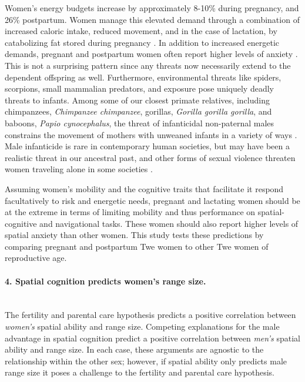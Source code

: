 Women's energy budgets increase by approximately 8-10\% during pregnancy, and 26\% postpartum.  Women manage this elevated demand through a combination of increased caloric intake, reduced movement, and in the case of lactation, by catabolizing fat stored during pregnancy \citep{dufour2002comparative}.  In addition to increased energetic demands, pregnant and postpartum women often report higher levels of anxiety \citep{heron2004course, wenzel2003prevalence}.  This is not a surprising pattern since any threats now necessarily extend to the dependent offspring as well.  Furthermore, environmental threats like spiders, scorpions, small mammalian predators, and exposure pose uniquely deadly threats to infants.  Among some of our closest primate relatives, including chimpanzees, \emph{Chimpanzee chimpanzee}, gorillas, \emph{Gorilla gorilla gorilla}, and baboons, \emph{Papio cynocephalus}, the threat of infanticidal non-paternal males constrains the movement of mothers with unweaned infants in a variety of ways \citep{collins1984infanticide, watts1989infanticide, smuts1992male, stokes2003female, watts2000infanticide}.  Male infanticide is rare in contemporary human societies, but may have been a realistic threat in our ancestral past, and other forms of sexual violence threaten women traveling alone in some societies \citep{gregor1987anxious}.


Assuming women's mobility and the cognitive traits that facilitate it respond facultatively to risk and energetic needs, pregnant and lactating women should be at the extreme in terms of limiting mobility and thus performance on spatial-cognitive and navigational tasks.  These women should also report higher levels of spatial anxiety than other women.  This study tests these predictions by comparing pregnant and postpartum Twe women to other Twe women of reproductive age.

\paragraph{4. Spatial cognition predicts women's range size.}\mbox{}\\

The fertility and parental care hypothesis predicts a positive correlation between \emph{women's} spatial ability and range size. Competing explanations for the male advantage in spatial cognition predict a positive correlation between \emph{men's} spatial ability and range size.  In each case, these arguments are agnostic to the relationship within the other sex; however, if spatial ability only predicts male range size it poses a challenge to the fertility and parental care hypothesis.  

